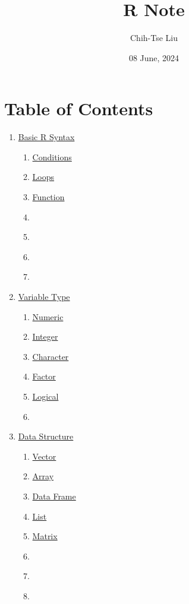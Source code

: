 \documentclass[
  12pt,
]{article}
\title{R Note}
\author{Chih-Tse Liu}
\date{08 June, 2024}
\begin{document}
\maketitle

\section{Table of Contents}
\label{sec:ToC}
\begin{enumerate}
\item \hyperref[sec:BRS]{Basic R Syntax}
  \begin{enumerate}
  \item \hyperref[sec:BRS-conditions]{Conditions}
  \item \hyperref[sec:BRS-loops]{Loops}
  \item \hyperref[sec:BRS-function]{Function}
  \item \hyperref[sec:BRS-]{}
  \item \hyperref[sec:BRS-]{}
  \item \hyperref[sec:BRS-]{}
  \item \hyperref[sec:BRS-]{}
  \end{enumerate}
\item \hyperref[sec:VAR]{Variable Type}
  \begin{enumerate}
  \item \hyperref[sec:VAR-numeric]{Numeric}
  \item \hyperref[sec:VAR-integer]{Integer}
  \item \hyperref[sec:VAR-character]{Character}
  \item \hyperref[sec:VAR-factor]{Factor}
  \item \hyperref[sec:VAR-logical]{Logical}
  \item \hyperref[sec:VAR-]{}
  \end{enumerate}
\item \hyperref[sec:DS]{Data Structure}
  \begin{enumerate}
  \item \hyperref[sec:DS-vector]{Vector}
  \item \hyperref[sec:DS-array]{Array}
  \item \hyperref[sec:DS-dataframe]{Data Frame}
  \item \hyperref[sec:DS-list]{List}
  \item \hyperref[sec:DS-matrix]{Matrix}
  \item \hyperref[sec:DS-]{}
  \item \hyperref[sec:DS-]{}
  \item \hyperref[sec:DS-]{}

\end{enumerate}
\end{enumerate}
\end{document}
